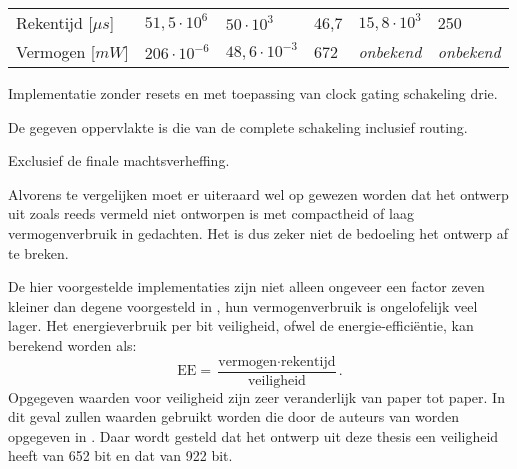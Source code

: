 \begin{table}[h]
\begin{narrow}{-2cm}{-2cm}
\begin{tabular}{llllll}
			Rekentijd [$\mu s$]															& $51,5 \cdot 10^6$			& $50 \cdot 10^3$				& 46,7						& $15,8 \cdot 10^3$			& 250\footnotemark[4]\\
			Vermogen [$mW$]																& $206 \cdot 10^{-6}$		& $48,6 \cdot 10^{-3}$		& 672							& \emph{onbekend}				& \emph{onbekend}\\
			\bottomrule		
		\end{tabular}
	\end{narrow}
	
	\footnotesize \footnotemark[2] Implementatie zonder resets en met toepassing van clock gating schakeling drie.
	
	\footnotemark[3] De gegeven oppervlakte is die van de complete schakeling inclusief routing.
	
	\footnotemark[4] Exclusief de finale machtsverheffing.
	
\end{table}

Alvorens te vergelijken moet er uiteraard wel op gewezen worden dat het ontwerp uit \cite{beuchat-asic} zoals reeds vermeld niet ontworpen is met compactheid of laag vermogenverbruik in gedachten. Het is dus zeker niet de bedoeling het ontwerp af te breken. 

De hier voorgestelde implementaties zijn niet alleen ongeveer een factor zeven kleiner dan degene voorgesteld in \cite{beuchat-asic}, hun vermogenverbruik is ongelofelijk veel lager. Het energieverbruik per bit veiligheid, ofwel de energie-effici\"entie, kan berekend worden als:
\[\text{EE} = \frac{\text{vermogen} \cdot \text{rekentijd}}{\text{veiligheid}}.\]
Opgegeven waarden voor veiligheid zijn zeer veranderlijk van paper tot paper. In dit geval zullen waarden gebruikt worden die door de auteurs van \cite{beuchat-asic} worden opgegeven in \cite{beuchat}. Daar wordt gesteld dat het ontwerp uit deze thesis een veiligheid heeft van 652 bit en dat van \cite{beuchat-asic} 922 bit.

